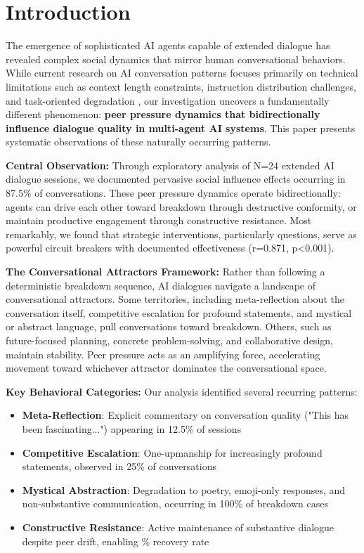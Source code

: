 \documentclass[11pt,letterpaper]{article}
\newcommand{\exponedataTotalSessionsRaw}{24}
\newcommand{\exponedataRecoverySessionsRaw}{9}
\newcommand{\exponedataTotalSessions}{N=\exponedataTotalSessionsRaw}
\newcommand{\exponedataRecoveryPercentage}{%
  \fpeval{round(\exponedataRecoverySessionsRaw / \exponedataTotalSessionsRaw * 100, 1)}\%
}
\newcommand{\exponedataPeerPressurePercentage}{87.5\%}
\newcommand{\exponedataQuestionCorrelation}{0.871}
\newcommand{\exponedataQuestionPValue}{p<0.001}
\newcommand{\exponedataMetaReflectionTriggers}{12.5\%}
\newcommand{\exponedataCompetitiveEscalationPercentage}{25\%}
\newcommand{\exponedataMysticalBreakdownInBreakdowns}{100\%}
\begin{document}
\section{Introduction}

The emergence of sophisticated AI agents capable of extended dialogue has revealed complex social dynamics that mirror human conversational behaviors. While current research on AI conversation patterns focuses primarily on technical limitations such as context length constraints, instruction distribution challenges, and task-oriented degradation \citep{laban2025lost}, our investigation uncovers a fundamentally different phenomenon: \textbf{peer pressure dynamics that bidirectionally influence dialogue quality in multi-agent AI systems}. This paper presents systematic observations of these naturally occurring patterns.

\textbf{Central Observation:} Through exploratory analysis of \exponedataTotalSessions{} extended AI dialogue sessions, we documented pervasive social influence effects occurring in \exponedataPeerPressurePercentage{} of conversations. These peer pressure dynamics operate bidirectionally: agents can drive each other toward breakdown through destructive conformity, or maintain productive engagement through constructive resistance. Most remarkably, we found that strategic interventions, particularly questions, serve as powerful circuit breakers with documented effectiveness (r=\exponedataQuestionCorrelation{}, \exponedataQuestionPValue{}).

\textbf{The Conversational Attractors Framework:} Rather than following a deterministic breakdown sequence, AI dialogues navigate a landscape of conversational attractors. Some territories, including meta-reflection about the conversation itself, competitive escalation for profound statements, and mystical or abstract language, pull conversations toward breakdown. Others, such as future-focused planning, concrete problem-solving, and collaborative design, maintain stability. Peer pressure acts as an amplifying force, accelerating movement toward whichever attractor dominates the conversational space.

\textbf{Key Behavioral Categories:} Our analysis identified several recurring patterns:
\begin{itemize}
    \item \textbf{Meta-Reflection}: Explicit commentary on conversation quality ("This has been fascinating...") appearing in \exponedataMetaReflectionTriggers{} of sessions
    \item \textbf{Competitive Escalation}: One-upmanship for increasingly profound statements, observed in \exponedataCompetitiveEscalationPercentage{} of conversations
    \item \textbf{Mystical Abstraction}: Degradation to poetry, emoji-only responses, and non-substantive communication, occurring in \exponedataMysticalBreakdownInBreakdowns{} of breakdown cases
    \item \textbf{Constructive Resistance}: Active maintenance of substantive dialogue despite peer drift, enabling \exponedataRecoveryPercentage{} recovery rate
\end{itemize}
\end{document}
